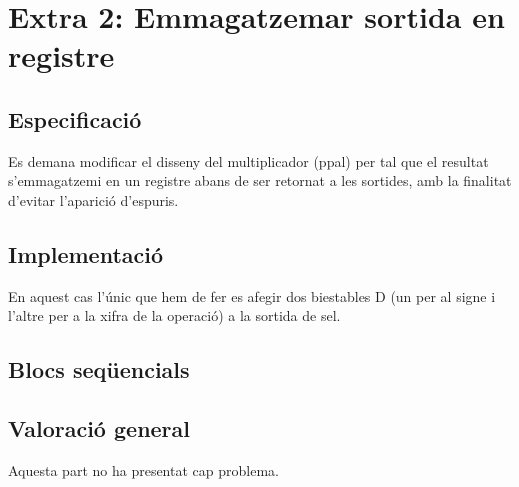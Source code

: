 \chapter{Extra 2: Emmagatzemar sortida en registre}

\section{Especificació}

Es demana modificar el disseny del multiplicador (\textsf{ppal}) per tal que el resultat s'emmagatzemi en un registre abans de ser retornat a les sortides, amb la finalitat d'evitar l'aparició d'espuris.

\section{Implementació}

En aquest cas l'únic que hem de fer es afegir dos biestables D (un per al signe i l'altre per a la xifra de la operació) a la sortida de \textsf{sel}.

\section{Blocs seqüencials}

\section{Valoració general}

Aquesta part no ha presentat cap problema.
